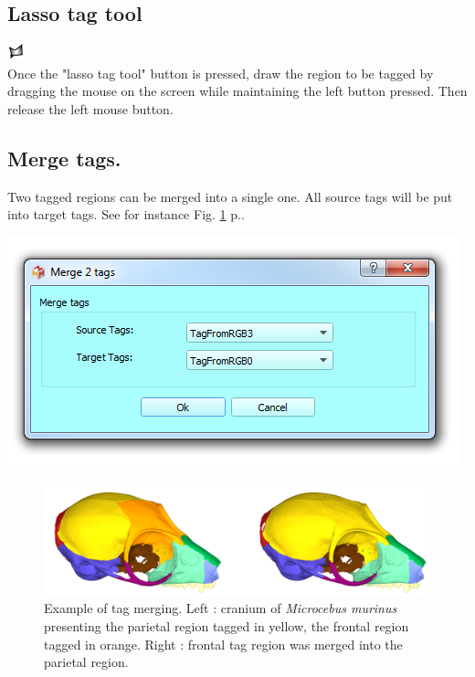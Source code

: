 \subsection{Lasso tag tool} \label{lasso_tag_section}
\includegraphics[scale=0.7]{images/12/lasso.png}\\
Once the "lasso tag tool" button is pressed, draw the region to be tagged by dragging the mouse on the screen while maintaining the left button pressed. Then release the left mouse button. 

\subsection{Merge tags.}
\noindent
\begin{minipage}{0.5\textwidth}
Two tagged regions can be merged into a single one. All source tags will be put into target tags. See for instance Fig. \ref{merge_tags} p.\pageref{merge_tags}.\end{minipage}    
\begin{minipage}{0.5\textwidth}\centering
  \includegraphics[scale=0.5]{images/12/merge_tags.png}
 \end{minipage} 
\noindent
\begin{figure}
  \centering
  \includegraphics[scale=0.25]{images/12/merge_example.png} 
	\caption{Example of tag merging. Left : cranium of \textit{Microcebus murinus} presenting the parietal region
tagged in yellow, the frontal region tagged in orange. Right : frontal tag region was merged into
the parietal region.}
\label{merge_tags}
\end{figure}